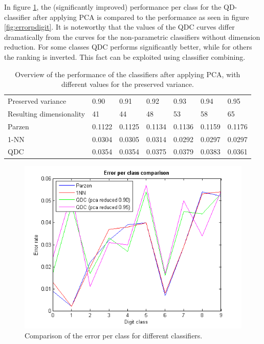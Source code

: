 In figure \ref{fig:errorpdigit2}, the (significantly improved) performance per class for the QD-classifier after applying PCA is compared to the performance as seen in figure \ref{fig:errorpdigit}. It is noteworthy that the values of the QDC curves differ dramatically from the curves for the non-parametric classifiers without dimension reduction. For some classes QDC performs significantly better, while for others the ranking is inverted. This fact can be exploited using classifier combining.
\begin{table}[H]
	\centering
	\caption{Overview of the performance of the classifiers after applying PCA, with different values for the preserved variance.}
	\label{tab:PCA}
	\begin{tabular}{l|llllll}
		Preserved variance       & 0.90   & 0.91   & 0.92   & 0.93   & 0.94   & 0.95   \\
		Resulting dimensionality & 41     & 44     & 48     & 53     & 58     & 65     \\ \hline
		Parzen                   & 0.1122 & 0.1125 & 0.1134 & 0.1136 & 0.1159 & 0.1176 \\
		1-NN                     & 0.0304 & 0.0305 & 0.0314 & 0.0292 & 0.0297 & 0.0297 \\
		QDC                      & 0.0354 & 0.0354 & 0.0375 & 0.0379 & 0.0383 & 0.0361
	\end{tabular}
\end{table}
\begin{figure}[H]
	\centering
	\includegraphics[scale=0.8]{images/pr_figure_3.png}
	\caption{Comparison of the error per class for different classifiers.}
	\label{fig:errorpdigit2}
\end{figure}
